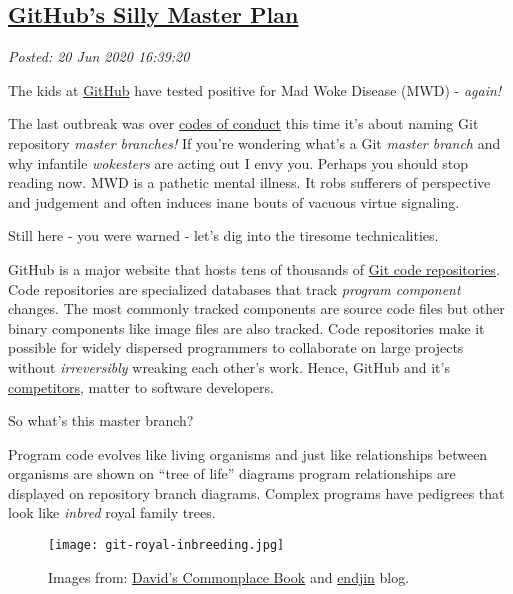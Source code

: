 %

\subsection*{\href{http://analyzethedatanotthedrivel.org/2020/06/20/githubs-silly-master-plan/}{GitHub's Silly Master Plan}}


\noindent\emph{Posted: 20 Jun 2020 16:39:20}
\vspace{6pt}

The kids at \href{https://github.com/}{GitHub} have tested positive for
Mad Woke Disease (MWD) - \emph{again!}

The last outbreak was over
\href{https://forums.theregister.com/forum/all/2018/10/22/sqlite_code_of_conduct/}{codes
of conduct} this time it's about naming Git repository \emph{master
branches!} If you're wondering what's a Git \emph{master branch} and why
infantile \emph{wokesters} are acting out I envy you. Perhaps you should
stop reading now. MWD is a pathetic mental illness. It robs sufferers of
perspective and judgement and often induces inane bouts of vacuous
virtue signaling.

Still here - you were warned - let's dig into the tiresome
technicalities.

GitHub is a major website that hosts tens of thousands of
\href{https://git-scm.com/}{Git code repositories}. Code repositories
are specialized databases that track \emph{program component} changes.
The most commonly tracked components are source code files but other
binary components like image files are also tracked. Code repositories
make it possible for widely dispersed programmers to collaborate on
large projects without \emph{irreversibly} wreaking each other's work.
Hence, GitHub and it's \href{https://bitbucket.org/}{competitors},
matter to software developers.

So what's this master branch?

Program code evolves like living organisms and just like relationships
between organisms are shown on ``tree of life'' diagrams program
relationships are displayed on repository branch diagrams. Complex
programs have pedigrees that look like \emph{inbred} royal family trees.


\captionsetup[figure]{labelformat=empty}
\begin{figure}[htbp]
\centering
\texttt{[image: git-royal-inbreeding.jpg]}
\caption{Images from: \href{https://davidscommonplacebook.wordpress.com/}{David's Commonplace
Book} and \href{https://endjin.com/blog/}{endjin} blog.}
\label{fig:5835x0}
\end{figure}

